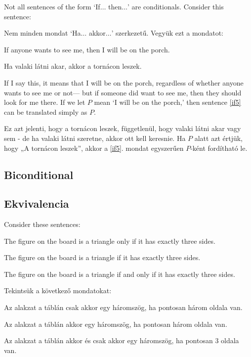 Not all sentences of the form `If$\ldots$ then$\ldots$' are conditionals. Consider this sentence:

Nem minden mondat `Ha$\ldots$ akkor$\ldots$' szerkezetű. Vegyük ezt a mondatot:

\begin{earg}
\item[\ex{if5}] If anyone wants to see me, then I will be on the porch.
\end{earg}

\begin{earg}
\item[\ex{if5}] Ha valaki látni akar, akkor a tornácon leszek.
\end{earg}

If I say this, it means that I will be on the porch, regardless of whether anyone wants to see me or not--- but if someone did want to see me, then they should look for me there. If we let $P$ mean `I will be on the porch,' then sentence \ref{if5} can be translated simply as $P$.

Ez azt jelenti, hogy a tornácon leszek, függetlenül, hogy valaki látni akar vagy sem - de ha valaki látni szeretne, akkor ott kell keresnie. Ha $P$ alatt azt értjük, hogy „A tornácon leszek”, akkor a \ref{if5}. mondat egyszerűen $P$-ként fordítható le.



\subsection*{Biconditional}

\subsection{Ekvivalencia}

Consider these sentences:
\begin{earg}
\item[\ex{iff1}] The figure on the board is a triangle only if it has exactly three sides.
\item[\ex{iff2}] The figure on the board is a triangle if it has exactly three sides.
\item[\ex{iff3}] The figure on the board is a triangle if and only if it has exactly three sides.
\end{earg}

Tekintsük a következő mondatokat:
\begin{earg}
\item[\ex{iff1}] Az alakzat a táblán csak akkor egy háromszög, ha pontosan három oldala van.
\item[\ex{iff2}] Az alakzat a táblán akkor egy háromszög, ha pontosan három oldala van.
\item[\ex{iff3}] Az alakzat a táblán akkor és csak akkor egy háromszög, ha pontosan 3 oldala van.
\end{earg}

